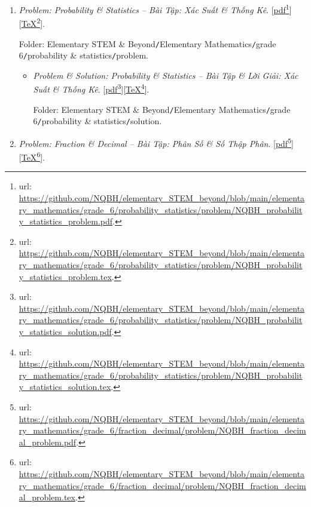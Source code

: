 \documentclass[12pt,oneside]{book}
\begin{document}
\begin{enumerate}
\begin{itemize}
		Folder: {\sf Elementary STEM \& Beyond{\tt/}Elementary Mathematics{\tt/}grade 6{\tt/}visual geometry{\tt/}solution}.
	\end{itemize}
	\item {\it Problem: Probability {\it\&} Statistics -- Bài Tập: Xác Suất {\it\&} Thống Kê}. [\href{https://github.com/NQBH/elementary_STEM_beyond/blob/main/elementary_mathematics/grade_6/probability_statistics/problem/NQBH_probability_statistics_problem.pdf}{pdf}\footnote{{\sc url}: \url{https://github.com/NQBH/elementary_STEM_beyond/blob/main/elementary_mathematics/grade_6/probability_statistics/problem/NQBH_probability_statistics_problem.pdf}.}][\href{https://github.com/NQBH/elementary_STEM_beyond/blob/main/elementary_mathematics/grade_6/probability_statistics/problem/NQBH_probability_statistics_problem.tex}{\TeX}\footnote{{\sc url}: \url{https://github.com/NQBH/elementary_STEM_beyond/blob/main/elementary_mathematics/grade_6/probability_statistics/problem/NQBH_probability_statistics_problem.tex}.}].
	
	Folder: {\sf Elementary STEM \& Beyond{\tt/}Elementary Mathematics{\tt/}grade 6{\tt/}probability \& statistics{\tt/}problem}.
	\begin{itemize}
		\item {\it Problem \& Solution: Probability {\it\&} Statistics -- Bài Tập \& Lời Giải: Xác Suất {\it\&} Thống Kê}. [\href{https://github.com/NQBH/elementary_STEM_beyond/blob/main/elementary_mathematics/grade_6/probability_statistics/problem/NQBH_probability_statistics_solution.pdf}{pdf}\footnote{{\sc url}: \url{https://github.com/NQBH/elementary_STEM_beyond/blob/main/elementary_mathematics/grade_6/probability_statistics/problem/NQBH_probability_statistics_solution.pdf}.}][\href{https://github.com/NQBH/elementary_STEM_beyond/blob/main/elementary_mathematics/grade_6/probability_statistics/problem/NQBH_probability_statistics_solution.tex}{\TeX}\footnote{{\sc url}: \url{https://github.com/NQBH/elementary_STEM_beyond/blob/main/elementary_mathematics/grade_6/probability_statistics/problem/NQBH_probability_statistics_solution.tex}.}].
		
		Folder: {\sf Elementary STEM \& Beyond{\tt/}Elementary Mathematics{\tt/}grade 6{\tt/}probability \& statistics{\tt/}solution}.
	\end{itemize}	
	\item {\it Problem: Fraction \& Decimal -- Bài Tập: Phân Số {\it\&} Số Thập Phân}. [\href{https://github.com/NQBH/elementary_STEM_beyond/blob/main/elementary_mathematics/grade_6/fraction_decimal/problem/NQBH_fraction_decimal_problem.pdf}{pdf}\footnote{{\sc url}: \url{https://github.com/NQBH/elementary_STEM_beyond/blob/main/elementary_mathematics/grade_6/fraction_decimal/problem/NQBH_fraction_decimal_problem.pdf}.}][\href{https://github.com/NQBH/elementary_STEM_beyond/blob/main/elementary_mathematics/grade_6/fraction_decimal/problem/NQBH_fraction_decimal_problem.tex}{\TeX}\footnote{{\sc url}: \url{https://github.com/NQBH/elementary_STEM_beyond/blob/main/elementary_mathematics/grade_6/fraction_decimal/problem/NQBH_fraction_decimal_problem.tex}.}].
	

\end{enumerate}
\end{document}
